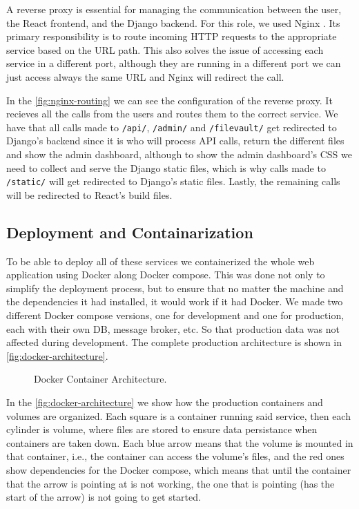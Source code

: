 A reverse proxy is essential for managing the communication between
the user, the React frontend, and the Django backend.
For this role, we used Nginx \autocite{Nginx}.
Its primary responsibility is to route incoming HTTP requests to the appropriate service based on the URL path.
This also solves the issue of accessing each service in a different port,
although they are running in a different port
we can just access always the same URL and Nginx will redirect the call.

In the \autoref{fig:nginx-routing}
we can see the configuration of the reverse proxy.
It recieves all the calls from the users and routes them to the correct service.
We have that all calls made to \texttt{/api/}, \texttt{/admin/} and \texttt{/filevault/}
get redirected to Django's backend since it is who will process \ac{API} calls,
return the different files and show the admin dashboard,
although to show the admin dashboard's CSS
we need to collect and serve the Django static files,
which is why calls made to \texttt{/static/} will get redirected to Django's static files.
Lastly, the remaining calls will be redirected to React's build files.

\subsection{Deployment and Containarization}



To be able to deploy all of these services we containerized the whole web application using Docker \autocite{merkelDockerLightweightLinux2014} along Docker compose.
This was done not only to simplify the deployment process,
but to ensure that no matter the machine and the dependencies it had installed,
it would work if it had Docker.
We made two different Docker compose versions, one for development and one for production,
each with their own \ac{DB}, message broker, etc. So that production data was not affected during development.
The complete production architecture is shown in \autoref{fig:docker-architecture}.

\begin{figure}[!htbp]
    \centering
    
    \caption{Docker Container Architecture.}
    \label{fig:docker-architecture}
\end{figure}

In the \autoref{fig:docker-architecture} we show how the production containers and volumes are organized.
Each square is a container running said service,
then each cylinder is volume, where files are stored to ensure data persistance when containers are taken down.
Each blue arrow means that the volume is mounted in that container, i.e., the container can access the volume's files,
and the red ones show dependencies for the Docker compose,
which means that until the container that the arrow is pointing at is not working,
the one that is pointing (has the start of the arrow) is not going to get started.

